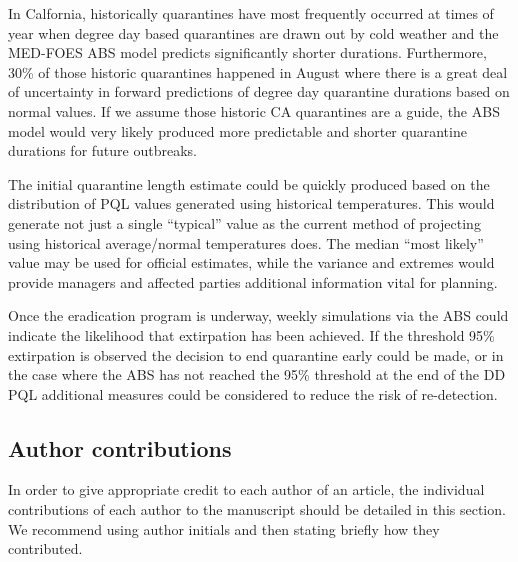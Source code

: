 \documentclass[10pt,a4paper,twocolumn]{article}
\begin{document}
In Calfornia, historically quarantines have most frequently occurred at times of year when 
degree day based quarantines are drawn out by cold weather and the MED-FOES ABS model predicts significantly
shorter durations.
Furthermore, 30\% of those historic quarantines happened in August where there is a great 
deal of uncertainty in forward predictions of degree day quarantine durations based on normal values.
If we assume those historic CA quarantines are a guide, the ABS model would very likely
produced more predictable and shorter quarantine durations for future outbreaks.





The initial quarantine length estimate could be quickly produced based on the distribution of PQL values
generated using historical temperatures.
This would generate not just a single ``typical'' value as the current method of projecting
using historical average/normal temperatures does.
The median ``most likely'' value may be used for official estimates, while
the variance and extremes would provide managers and affected parties additional
information vital for planning.

Once the eradication program is underway, weekly simulations
via the ABS could indicate the likelihood that extirpation has been achieved. If the threshold 
95\% extirpation is observed the decision to end quarantine early could be made, or in the case 
where the ABS has not reached the 95\% threshold at the end of the DD PQL additional measures could 
be considered to reduce the risk of re-detection.





\subsection*{Author contributions}
In order to give appropriate credit to each author of an article, the individual
contributions of each author to the manuscript should be detailed in this section. We
recommend using author initials and then stating briefly how they contributed.
\end{document}
